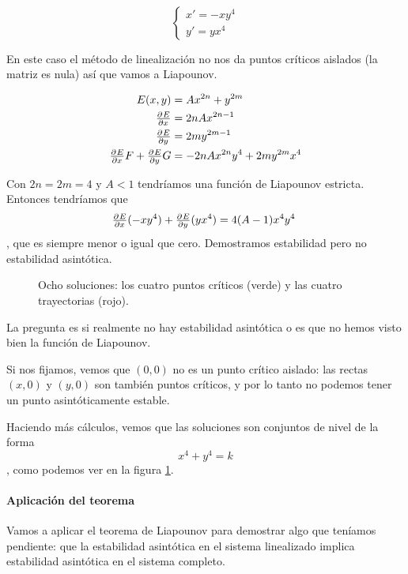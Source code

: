 \begin{example} \[\begin{cases} x' = -xy^4 \\ y'=yx^4 \end{cases} \]

En este caso el método de linealización no nos da puntos críticos aislados (la matriz es nula) así que vamos a Liapounov.

\begin{align*}
E(x,y) &= Ax^{2n} + y^{2m} \\
\pd{E}{x} &= 2n Ax^{2n-1} \\
\pd{E}{y} &= 2my^{2m-1} \\
\pd{E}{x}F + \pd{E}{y}G &= -2nAx^{2n}y^4 + 2my^{2m}x^4
\end{align*}

Con $2n=2m=4$ y $A<1$ tendríamos una función de Liapounov estricta. Entonces tendríamos que \[ \pd{E}{x}(-xy^4) + \pd{E}{y}(yx^4) = 4(A-1)x^4y^4 \], que es siempre menor o igual que cero. Demostramos estabilidad pero no estabilidad asintótica.

\begin{figure}
\label{img8-Ej3}
\caption{Ocho soluciones: los cuatro puntos críticos (verde) y las cuatro trayectorias (rojo).}
\end{figure}

La pregunta es si realmente no hay estabilidad asintótica o es que no hemos visto bien la función de Liapounov. 

Si nos fijamos, vemos que $(0,0)$ no es un punto crítico aislado: las rectas $(x,0)$ y $(y,0)$ son también puntos críticos, y por lo tanto no podemos tener un punto asintóticamente estable.

Haciendo más cálculos, vemos que las soluciones son conjuntos de nivel de la forma \[ x^4 + y^4 = k \], como podemos ver en la figura \ref{img8-Ej3}.
\end{example}


\paragraph{Aplicación del teorema} Vamos a aplicar el teorema de Liapounov para demostrar algo que teníamos pendiente: que la estabilidad asintótica en el sistema linealizado implica estabilidad asintótica en el sistema completo.

